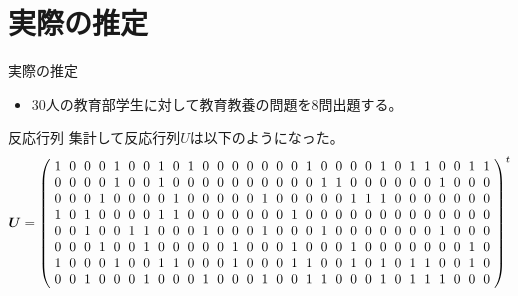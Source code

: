 \documentclass[aspectratio=169, dvipdfmx, 12pt]{beamer}
\begin{document}
\section{実際の推定}
\begin{frame}
  \begin{block}{実際の推定}
    \begin{itemize}
      \item $30$人の教育部学生に対して教育教養の問題を$8$問出題する。
    \end{itemize}
  \end{block}
  \begin{block}{反応行列}
    集計して反応行列$U$は以下のようになった。
        \[ \boldsymbol{U} =
    \left(
    \renewcommand{\arraycolsep}{3pt}
    \begin{array}{cccccccccccccccccccccccccccccc}
    1 & 0 & 0 & 0 & 1 & 0 & 0 & 1 & 0 & 1 & 0 & 0 & 0 & 0 & 0 & 0 & 0 & 1 & 0 & 0 & 0 & 0 & 1 & 0 & 1 & 1 & 0 & 0 & 1 & 1\\
    0 & 0 & 0 & 0 & 1 & 0 & 0 & 1 & 0 & 0 & 0 & 0 & 0 & 0 & 0 & 0 & 0 & 0 & 1 & 1 & 0 & 0 & 0 & 0 & 0 & 0 & 1 & 0 & 0 & 0\\
    0 & 0 & 0 & 1 & 0 & 0 & 0 & 0 & 1 & 0 & 0 & 0 & 0 & 0 & 1 & 0 & 0 & 0 & 0 & 0 & 1 & 1 & 1 & 0 & 0 & 0 & 0 & 0 & 0 & 0\\
    1 & 0 & 1 & 0 & 0 & 0 & 0 & 1 & 1 & 0 & 0 & 0 & 0 & 0 & 0 & 0 & 1 & 0 & 0 & 0 & 0 & 0 & 0 & 0 & 0 & 0 & 0 & 0 & 0 & 0\\
    0 & 0 & 1 & 0 & 0 & 1 & 1 & 0 & 0 & 0 & 1 & 0 & 0 & 0 & 1 & 0 & 0 & 0 & 1 & 0 & 0 & 0 & 0 & 0 & 0 & 0 & 1 & 0 & 0 & 0\\
    0 & 0 & 0 & 1 & 0 & 0 & 1 & 0 & 0 & 0 & 0 & 0 & 1 & 0 & 0 & 0 & 1 & 0 & 0 & 0 & 1 & 0 & 0 & 0 & 0 & 0 & 0 & 0 & 1 & 0\\
    1 & 0 & 0 & 0 & 1 & 0 & 0 & 1 & 1 & 0 & 0 & 0 & 1 & 0 & 0 & 0 & 1 & 1 & 0 & 0 & 1 & 0 & 1 & 0 & 1 & 1 & 0 & 0 & 1 & 0\\
    0 & 0 & 1 & 0 & 0 & 0 & 1 & 0 & 0 & 0 & 1 & 0 & 0 & 0 & 1 & 0 & 0 & 1 & 1 & 0 & 0 & 0 & 1 & 0 & 1 & 1 & 1 & 0 & 0 &0
    \end{array}
    \right)^t
    \]
  \end{block}
\end{frame}
\end{document}
